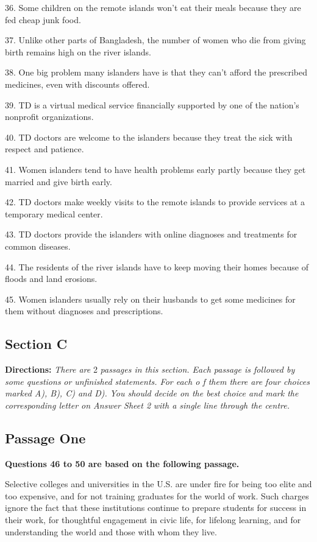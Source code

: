 \documentclass[UTF8,11pt]{ctexart}
\begin{document}
36. Some children on the remote islands won't eat their meals because they are fed cheap junk food.


37. Unlike other parts of Bangladesh, the number of women who die from giving birth remains high on the river islands.


38. One big problem many islanders have is that they can't afford the prescribed medicines, even with discounts offered.


39. TD is a virtual medical service financially supported by one of the nation's nonprofit organizations.


40. TD doctors are welcome to the islanders because they treat the sick with respect and patience.


41. Women islanders tend to have health problems early partly because they get married and give birth early.


42. TD doctors make weekly visits to the remote islands to provide services at a temporary medical center.


43. TD doctors provide the islanders with online diagnoses and treatments for common diseases.


44. The residents of the river islands have to keep moving their homes because of floods and land erosions.


45. Women islanders usually rely on their husbands to get some medicines for them without diagnoses and prescriptions.


\subsection*{\textbf{Section C}}


\textbf{Directions: }\textit{There are} 2 \textit{passages in this section. Each passage is followed by some questions} \textit{or unfinished statements. For each o f them there are four choices marked A), B), C) and D).} \textit{You should decide on the best choice and mark the corresponding letter on Answer Sheet 2} \textit{with a single line through the centre.}


\subsection*{\textbf{Passage One}}


\textbf{Questions 46 to 50 are based on the following passage.}


Selective colleges and universities in the U.S. are under fire for being too elite and too expensive, and for not training graduates for the world of work. Such charges ignore the fact that these institutions continue to prepare students for success in their work, for thoughtful engagement in civic life, for lifelong learning, and for understanding the world and those with whom they live.
\end{document}
